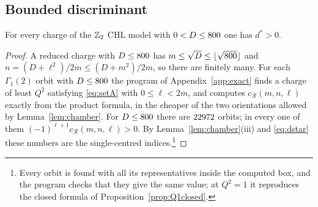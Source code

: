 \subsection{Bounded discriminant}
\begin{theorem}\label{thm:bounded}
For every charge of the $\mathbb{Z}_2$ CHL model with $0<D\le800$ one has $d^*>0$.
\end{theorem}
\begin{proof}
A reduced charge with $D\le800$ has $m\le\sqrt D\le\lfloor\sqrt{800}\rfloor$ and $n=(D+\ell^2)/2m\le(D+m^2)/2m$, so there are finitely many. For each $\Gamma_1(2)$ orbit with $D\le800$ the program of Appendix~\ref{app:exact} finds a charge of least $Q^2$ satisfying \eqref{eq:setA} with $0\le\ell<2m$, and computes $c_{\mathcal R}(m,n,\ell)$ exactly from the product formula, in the cheaper of the two orientations allowed by Lemma~\ref{lem:chamber}. For $D\le800$ there are $22972$ orbits; in every one of them $(-1)^{\ell+1}c_{\mathcal R}(m,n,\ell)>0$. By Lemma~\ref{lem:chamber}(iii) and \eqref{eq:dstar} these numbers are the single-centred indices.\footnote{Every orbit is found with all its representatives inside the computed box, and the program checks that they give the same value; at $Q^2=1$ it reproduces the closed formula of Proposition~\ref{prop:Q1closed}.}
\end{proof}
